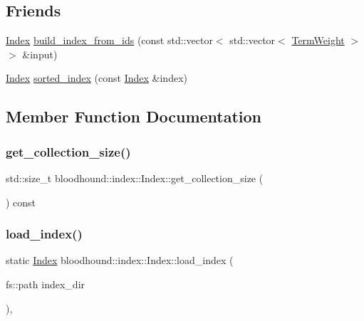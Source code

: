 \subsection*{Friends}
\begin{DoxyCompactItemize}
\item 
\hyperlink{classbloodhound_1_1index_1_1Index}{Index} \hyperlink{classbloodhound_1_1index_1_1Index_ae264daa8ced263330012e402103839fb}{build\+\_\+index\+\_\+from\+\_\+ids} (const std\+::vector$<$ std\+::vector$<$ \hyperlink{structbloodhound_1_1TermWeight}{Term\+Weight} $>$$>$ \&input)
\item 
\hyperlink{classbloodhound_1_1index_1_1Index}{Index} \hyperlink{classbloodhound_1_1index_1_1Index_a835545d5a58db5d720a5a31d71559084}{sorted\+\_\+index} (const \hyperlink{classbloodhound_1_1index_1_1Index}{Index} \&index)
\end{DoxyCompactItemize}


\subsection{Member Function Documentation}
\mbox{\label{classbloodhound_1_1index_1_1Index_afa55cbdb8bc65b9d26fcf4e560a45ab5}} 
\subsubsection{\texorpdfstring{get\+\_\+collection\+\_\+size()}{get\_collection\_size()}}
{\footnotesize\ttfamily std\+::size\+\_\+t bloodhound\+::index\+::\+Index\+::get\+\_\+collection\+\_\+size (\begin{DoxyParamCaption}{ }\end{DoxyParamCaption}) const\hspace{0.3cm}{\ttfamily [inline]}}

\mbox{\label{classbloodhound_1_1index_1_1Index_a6728545e1d5eaf5c5f13528c8c96a9ce}} 
\subsubsection{\texorpdfstring{load\+\_\+index()}{load\_index()}}
{\footnotesize\ttfamily static \hyperlink{classbloodhound_1_1index_1_1Index}{Index} bloodhound\+::index\+::\+Index\+::load\+\_\+index (\begin{DoxyParamCaption}\item[{fs\+::path}]{index\+\_\+dir }\end{DoxyParamCaption})\hspace{0.3cm}{\ttfamily [inline]}, {\ttfamily [static]}}

